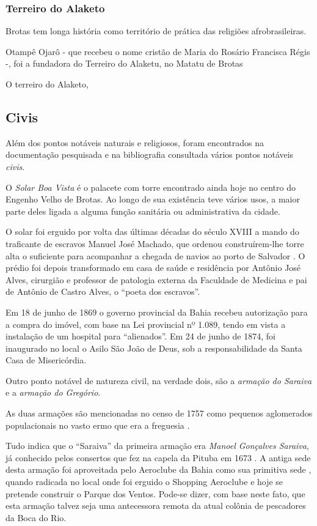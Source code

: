 \subsubsection{Terreiro do Alaketo}

Brotas tem longa história como território de prática das religiões afrobrasileiras. 


Otampê Ojarô - que recebeu o nome cristão de Maria do Rosário Francisca Régis -, foi a fundadora do Terreiro do Alaketu, no Matatu de Brotas


O terreiro do Alaketo,

\subsection{Civis}\label{subsec:pontciv}

Além dos pontos notáveis naturais e religiosos, foram encontrados na documentação pesquisada e na bibliografia consultada vários pontos notáveis \textit{civis}.

O \textit{Solar Boa Vista} é o palacete com torre encontrado ainda hoje no centro do Engenho Velho de Brotas. Ao longo de sua existência teve vários usos, a maior parte deles ligada a alguma função sanitária ou administrativa da cidade.

O solar foi erguido por volta das últimas décadas do século XVIII a mando do traficante de escravos Manuel José Machado, que ordenou construírem-lhe torre alta o suficiente para acompanhar a chegada de navios ao porto de Salvador \cite[p.~127]{mattos_panorama_2011}. O prédio foi depois transformado em casa de saúde e residência por Antônio José Alves, cirurgião e professor de patologia externa da Faculdade de Medicina e pai de Antônio de Castro Alves, o ``poeta dos escravos''.  

Em 18 de junho de 1869 o governo provincial da Bahia recebeu autorização para a compra do imóvel, com base na Lei provincial nº 1.089, tendo em vista a instalação de um hospital para ``alienados''. Em 24 de junho de 1874, foi inaugurado no local o Asilo São João de Deus, sob a responsabilidade da Santa Casa de Misericórdia.

Outro ponto notável de natureza civil, na verdade dois, são a \textit{armação do Saraiva} e a \textit{armação do Gregório}.

As duas armações são mencionadas no censo de 1757 como pequenos aglomerados populacionais no vasto ermo que era a freguesia \cite[p.~183]{castralmeida_ultramar_1908}.

Tudo indica que o ``Saraiva'' da primeira armação era \textit{Manoel Gonçalves Saraiva}, já conhecido pelos consertos que fez na capela da Pituba em 1673 \cite[p.~11]{ott_engenhos_1996}. A antiga sede desta armação foi aproveitada pelo Aeroclube da Bahia como sua primitiva sede \cite[p.~III-11, verso]{teixeira_doacoes_1978}, quando radicada no local onde foi erguido o Shopping Aeroclube e hoje se pretende construir o Parque dos Ventos. Pode-se dizer, com base neste fato, que esta armação talvez seja uma antecessora remota da atual colônia de pescadores da Boca do Rio.

